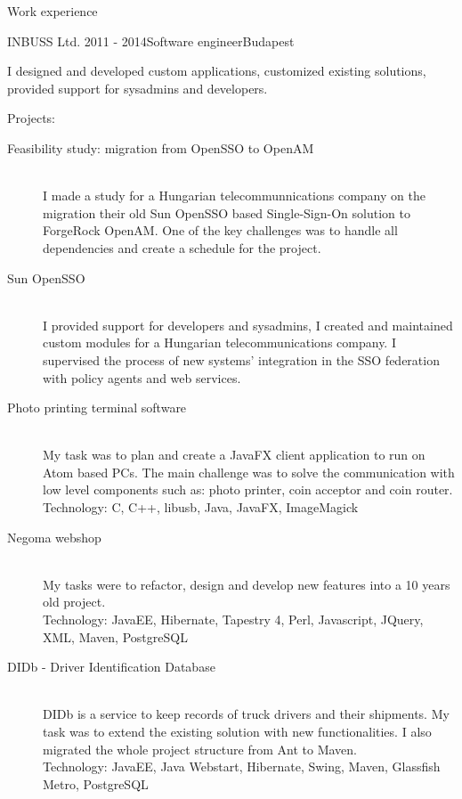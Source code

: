 \documentclass{resume} %
\begin{document}
\begin{rSection}{Work experience}
\begin{rSubsection}{INBUSS Ltd.}
{2011 - 2014}{Software engineer}{Budapest}
\item I designed and developed custom applications, customized existing solutions, provided support for sysadmins and developers.
\item Projects:
	\begin{description}
		\item[Feasibility study: migration from OpenSSO to OpenAM] \hfill \\
		I made a study for a Hungarian telecommunnications company on the migration their old Sun OpenSSO based
		Single-Sign-On solution to ForgeRock OpenAM.
		One of the key challenges was to handle all dependencies and create a schedule for the project.
		\item[Sun OpenSSO] \hfill \\
		I provided support for developers and sysadmins, I created and maintained custom modules for
		a Hungarian telecommunications company. I supervised the process of new systems'
		integration in the SSO federation with policy agents and web services.
		\item[Photo printing terminal software] \hfill \\
		My task was to plan and create a JavaFX client application to run on Atom based PCs.
		The main challenge was to solve the communication with low level components such as: photo printer,
		coin acceptor and coin router. \\
		Technology: C, C++, libusb, Java, JavaFX, ImageMagick
		\item[Negoma webshop] \hfill \\
		My tasks were to refactor, design and develop new features into a 10 years old project. \\
		Technology: JavaEE, Hibernate, Tapestry 4, Perl, Javascript, JQuery, XML, Maven, PostgreSQL
		\item[DIDb - Driver Identification Database] \hfill \\
		DIDb is a service to keep records of truck drivers and their shipments.
		My task was to extend the existing solution with new functionalities.
		I also migrated the whole project structure from Ant to Maven. \\
		Technology: JavaEE, Java Webstart, Hibernate, Swing, Maven, Glassfish Metro,
		PostgreSQL
	\end{description}
\end{rSubsection}


\end{rSection}
\end{document}
